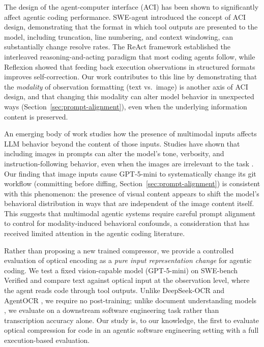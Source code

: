 The design of the agent-computer interface (ACI) has been shown to significantly affect agentic coding performance. SWE-agent \cite{yang2024sweagent} introduced the concept of ACI design, demonstrating that the format in which tool outputs are presented to the model, including truncation, line numbering, and context windowing, can substantially change resolve rates. The ReAct framework \cite{yao2022react} established the interleaved reasoning-and-acting paradigm that most coding agents follow, while Reflexion \cite{shinn2023reflexion} showed that feeding back execution observations in structured formats improves self-correction. Our work contributes to this line by demonstrating that the \emph{modality} of observation formatting (text vs.\ image) is another axis of ACI design, and that changing this modality can alter model behavior in unexpected ways (Section~\ref{sec:prompt-alignment}), even when the underlying information content is preserved.

An emerging body of work studies how the presence of multimodal inputs affects LLM behavior beyond the content of those inputs. Studies have shown that including images in prompts can alter the model's tone, verbosity, and instruction-following behavior, even when the images are irrelevant to the task \cite{gong2023figstep}. Our finding that image inputs cause GPT-5-mini to systematically change its git workflow (committing before diffing, Section~\ref{sec:prompt-alignment}) is consistent with this phenomenon: the presence of visual content appears to shift the model's behavioral distribution in ways that are independent of the image content itself. This suggests that multimodal agentic systems require careful prompt alignment to control for modality-induced behavioral confounds, a consideration that has received limited attention in the agentic coding literature.

Rather than proposing a new trained compressor, we provide a controlled evaluation of optical encoding as a \emph{pure input representation change} for agentic coding. We test a fixed vision-capable model (GPT-5-mini) on SWE-bench Verified and compare text against optical input at the observation level, where the agent reads code through tool outputs. Unlike DeepSeek-OCR \cite{wei2025deepseekocr} and AgentOCR \cite{feng2026agentocr}, we require no post-training; unlike document understanding models \cite{blecher2023nougat,lee2022pix2struct}, we evaluate on a downstream software engineering task rather than transcription accuracy alone. Our study is, to our knowledge, the first to evaluate optical compression for code in an agentic software engineering setting with a full execution-based evaluation.

